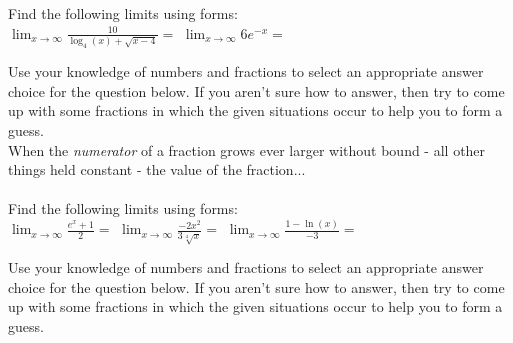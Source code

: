\documentclass[10pt]{article}
\begin{document}
\newpage

 Find the following limits using forms:\\

$\displaystyle\lim_{x\to\infty} \frac{10}{\log_4(x)+\sqrt{x-4}}=$ 
\hspace{3cm} $\displaystyle\lim_{x\to\infty} 6e^{-x}=$ 
\hfill

\vfill

\lform  {}


 Use your knowledge of numbers and fractions to select an appropriate answer choice for the question below. If you aren't sure how to answer, then try to come up with some fractions in which the given situations occur to help you to form a guess.\\

When the {\it numerator} of a fraction grows ever larger without bound - all other things held constant - the value of the fraction...\\
\\ 
 Find the following limits using forms:\\

$\displaystyle\lim_{x\to\infty} \frac{e^x+1}{2}=$ 
\hfill 
$\displaystyle\lim_{x\to\infty} \frac{-2x^2}{3\sqrt[4]{x}}=$ 
\hfill 
$\displaystyle\lim_{x\to\infty} \frac{1-\ln(x)}{-3}=$  
\hfill


\lform  \blue{\bf $\dfrac{\infty}{\infty}$}


 Use your knowledge of numbers and fractions to select an appropriate answer choice for the question below. If you aren't sure how to answer, then try to come up with some fractions in which the given situations occur to help you to form a guess.\\
\end{document}
